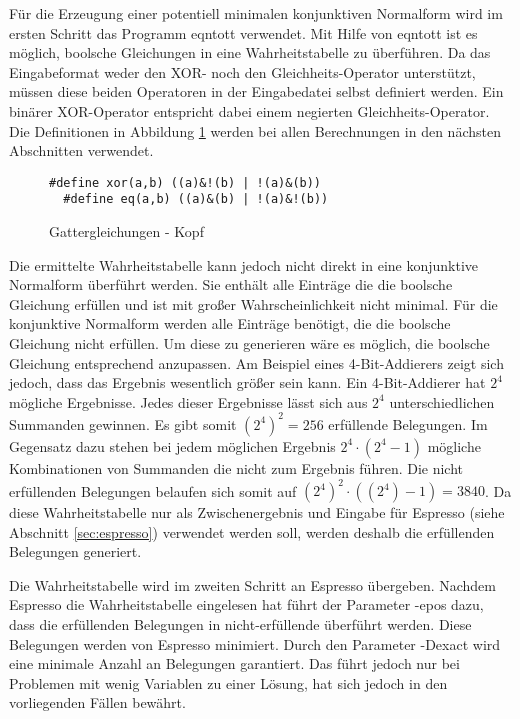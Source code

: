 Für die Erzeugung einer potentiell minimalen konjunktiven Normalform wird im ersten Schritt das Programm eqntott verwendet. Mit Hilfe von eqntott
ist es möglich, boolsche Gleichungen in eine Wahrheitstabelle zu überführen. Da das Eingabeformat weder den XOR- noch den Gleichheits-Operator unterstützt,
müssen diese beiden Operatoren in der Eingabedatei selbst definiert werden. Ein binärer XOR-Operator entspricht dabei einem negierten Gleichheits-Operator.
Die Definitionen in Abbildung \ref{fig:gatter_equations_head} werden bei allen Berechnungen in den nächsten Abschnitten verwendet.
\begin{figure}[!h]
  \centering
  \begin{minipage}[c]{14.5cm}
    \begin{lstlisting}[]
  #define xor(a,b) ((a)&!(b) | !(a)&(b))
  #define eq(a,b) ((a)&(b) | !(a)&!(b))
    \end{lstlisting}
  \end{minipage}
  \caption{Gattergleichungen - Kopf}
  \label{fig:gatter_equations_head}
\end{figure}

Die ermittelte Wahrheitstabelle kann jedoch nicht direkt in eine konjunktive Normalform überführt werden. Sie enthält alle Einträge die die boolsche Gleichung erfüllen
und ist mit großer Wahrscheinlichkeit nicht minimal. Für die konjunktive Normalform werden alle Einträge benötigt, die die boolsche Gleichung nicht erfüllen. Um diese zu
generieren wäre es möglich, die boolsche Gleichung entsprechend anzupassen. Am Beispiel eines 4-Bit-Addierers zeigt sich jedoch, dass das Ergebnis wesentlich größer sein kann.
Ein 4-Bit-Addierer hat $2^4$ mögliche Ergebnisse. Jedes dieser Ergebnisse lässt sich aus $2^4$ unterschiedlichen Summanden gewinnen. Es gibt somit $(2^4)^2 = 256$
erfüllende Belegungen. Im Gegensatz dazu stehen bei jedem möglichen Ergebnis $2^4 \cdot (2^4-1)$ mögliche Kombinationen von Summanden die nicht zum Ergebnis führen.
Die nicht erfüllenden Belegungen belaufen sich somit auf $(2^4)^2 \cdot ((2^4)-1) = 3840$. Da diese Wahrheitstabelle nur als Zwischenergebnis und Eingabe für
Espresso (siehe Abschnitt \ref{sec:espresso}) verwendet werden soll, werden deshalb die erfüllenden Belegungen generiert.

Die Wahrheitstabelle wird im zweiten Schritt an Espresso übergeben. Nachdem Espresso die Wahrheitstabelle eingelesen hat führt der Parameter -epos dazu,
dass die erfüllenden Belegungen in nicht-erfüllende überführt werden. Diese Belegungen werden von Espresso minimiert. Durch den Parameter -Dexact wird
eine minimale Anzahl an Belegungen garantiert. Das führt jedoch nur bei Problemen mit wenig Variablen zu einer Lösung, hat sich jedoch in den vorliegenden
Fällen bewährt.

